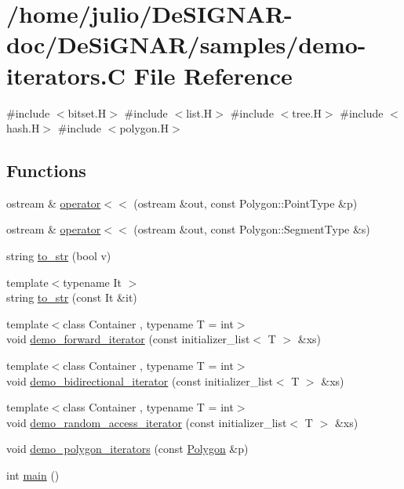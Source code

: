 \hypertarget{demo-iterators_8_c}{}\section{/home/julio/\+De\+S\+I\+G\+N\+A\+R-\/doc/\+De\+Si\+G\+N\+A\+R/samples/demo-\/iterators.C File Reference}
\label{demo-iterators_8_c}
{\ttfamily \#include $<$bitset.\+H$>$}\newline
{\ttfamily \#include $<$list.\+H$>$}\newline
{\ttfamily \#include $<$tree.\+H$>$}\newline
{\ttfamily \#include $<$hash.\+H$>$}\newline
{\ttfamily \#include $<$polygon.\+H$>$}\newline
\subsection*{Functions}
\begin{DoxyCompactItemize}
\item 
ostream \& \hyperlink{demo-iterators_8_c_a923e96e2eb2a21cf7d668e804417c47a}{operator$<$$<$} (ostream \&out, const Polygon\+::\+Point\+Type \&p)
\item 
ostream \& \hyperlink{demo-iterators_8_c_aeeb3d06d99a03eacdce5a549712941cb}{operator$<$$<$} (ostream \&out, const Polygon\+::\+Segment\+Type \&s)
\item 
string \hyperlink{demo-iterators_8_c_af423c937ed0522544ed90c34b85d897e}{to\+\_\+str} (bool v)
\item 
{\footnotesize template$<$typename It $>$ }\\string \hyperlink{demo-iterators_8_c_af8bbc1c2b472077a39826f8635457c12}{to\+\_\+str} (const It \&it)
\item 
{\footnotesize template$<$class Container , typename T  = int$>$ }\\void \hyperlink{demo-iterators_8_c_a971180b8ea13c61009c451fe7a942839}{demo\+\_\+forward\+\_\+iterator} (const initializer\+\_\+list$<$ T $>$ \&xs)
\item 
{\footnotesize template$<$class Container , typename T  = int$>$ }\\void \hyperlink{demo-iterators_8_c_a26a099cedf4512aa8f05c2dd18e4b3d2}{demo\+\_\+bidirectional\+\_\+iterator} (const initializer\+\_\+list$<$ T $>$ \&xs)
\item 
{\footnotesize template$<$class Container , typename T  = int$>$ }\\void \hyperlink{demo-iterators_8_c_ad21d9d25e5563ab0ee7ebd1a3092b1df}{demo\+\_\+random\+\_\+access\+\_\+iterator} (const initializer\+\_\+list$<$ T $>$ \&xs)
\item 
void \hyperlink{demo-iterators_8_c_a17b3db72ea3737c300ed830ce644aba8}{demo\+\_\+polygon\+\_\+iterators} (const \hyperlink{class_designar_1_1_polygon}{Polygon} \&p)
\item 
int \hyperlink{demo-iterators_8_c_ae66f6b31b5ad750f1fe042a706a4e3d4}{main} ()
\end{DoxyCompactItemize}


